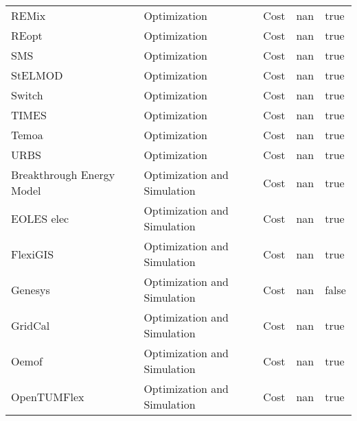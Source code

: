 \begin{tabular}{llllrl}
REMix   &  \cite{gils_integrated_2017}  &  Optimization   &  Cost  & nan &  true   \\
REopt   &  \cite{simpkins_reopt_nodate}  &  Optimization   &  Cost  & nan &  true   \\
SMS   &  \cite{the_sms_team_sms_2022}  &  Optimization   &  Cost  & nan &  true   \\
StELMOD   &  \cite{abrell_integrating_2015}  &  Optimization   &  Cost  & nan &  true   \\
Switch   &  \cite{johnston_switch_2019}  &  Optimization   &  Cost  & nan &  true   \\
TIMES   &  \cite{loulou_documentation_2016}  &  Optimization   &  Cost  & nan &  true   \\
Temoa   &  \cite{hunter_modeling_2013}  &  Optimization   &  Cost  & nan &  true   \\
URBS   &  \cite{dorfner_open_2015}  &  Optimization   &  Cost  & nan &  true   \\
Breakthrough Energy Model  &  \cite{xu_us_2020}  &  Optimization  and Simulation   &  Cost  & nan &  true   \\
EOLES elec  &  \cite{shirizadeh_how_2022}  &  Optimization  and Simulation   &  Cost  & nan &  true   \\
FlexiGIS   &  \cite{alhamwi_gis-based_2017}  &  Optimization  and Simulation   &  Cost  & nan &  true   \\
Genesys   &  \cite{bussar_optimal_2014}  &  Optimization  and Simulation   &  Cost  & nan &  false   \\
GridCal   &  \cite{vera_gridcal_2022}  &  Optimization  and Simulation   &  Cost  & nan &  true   \\
Oemof   &  \cite{hilpert_open_2018}  &  Optimization  and Simulation   &  Cost  & nan &  true   \\
OpenTUMFlex   &  \cite{zade_quantifying_2020}  &  Optimization  and Simulation   &  Cost  & nan &  true   \\

\end{tabular}
